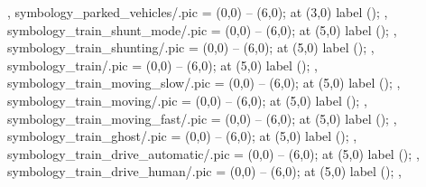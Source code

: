 {{{{{{{          }%
        }%
      }%
    }%
    \iftoggle{is_parked}{%
      \coordinate (ts-v-l)  at (0,0);%
    }{%
      \coordinate (ts-v-l) at ($\facefactor*-0.5*(\objectlength,0)$);%
    }%
    \iftoggle{train_is_a_ghost}{%
      \coordinate (ts-v-l) at ($(ts-v-l) + (0,0.16)$);%
    }{}%
  }},%
  symbology_parked_vehicles/.pic = {%
    \secondarytrack (0,0) -- (6,0);%
    \parkedvehicles[] at (3,0) label ();%
  },%
  symbology_train_shunt_mode/.pic = {%
    \maintrack (0,0) -- (6,0);%
    \shunting[forward] at (5,0) label ();%
  },%
  symbology_train_shunting/.pic = {%
    \maintrack (0,0) -- (6,0);%
     at (5,0) label ();%
  },%
  symbology_train/.pic = {%
    \maintrack (0,0) -- (6,0);%
    \train[forward] at (5,0) label ();%
  },%
  symbology_train_moving_slow/.pic = {%
    \maintrack (0,0) -- (6,0);%
    \train[run=slow,forward] at (5,0) label ();%
  },%
  symbology_train_moving/.pic = {%
    \maintrack (0,0) -- (6,0);%
    \train[run=normal,forward] at (5,0) label ();%
  },%
  symbology_train_moving_fast/.pic = {%
    \maintrack (0,0) -- (6,0);%
    \train[run=fast,forward] at (5,0) label ();%
  },%
  symbology_train_ghost/.pic = {%
    \maintrack (0,0) -- (6,0);%
     at (5,0) label ();%
  },%
  symbology_train_drive_automatic/.pic = {%
    \maintrack (0,0) -- (6,0);%
    \train[operation=automatic,forward] at (5,0) label ();%
  },%
  symbology_train_drive_human/.pic = {%
    \maintrack (0,0) -- (6,0);%
    \train[operation=manual,forward] at (5,0) label ();%
  },%
}%
%
\endinput%
%